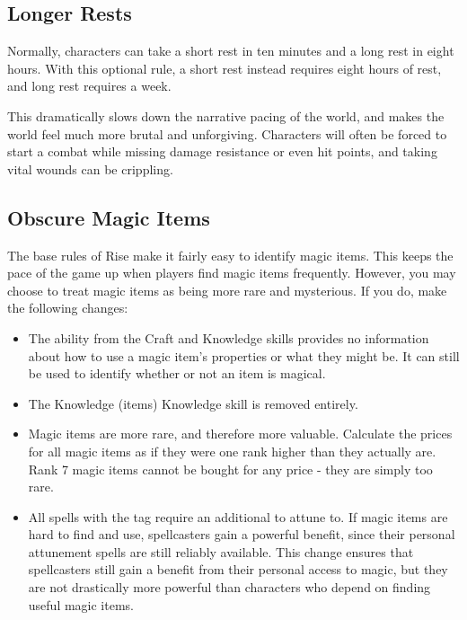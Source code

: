   \subsection{Longer Rests}\label{Longer Rests}
    Normally, characters can take a short rest in ten minutes and a long rest in eight hours.
    With this optional rule, a short rest instead requires eight hours of rest, and long rest requires a week.

    This dramatically slows down the narrative pacing of the world, and makes the world feel much more brutal and unforgiving.
    Characters will often be forced to start a combat while missing damage resistance or even hit points, and taking vital wounds can be crippling.

  \subsection{Obscure Magic Items}\label{Obscure Magic Items}
    The base rules of Rise make it fairly easy to identify magic items.
    This keeps the pace of the game up when players find magic items frequently.
    However, you may choose to treat magic items as being more rare and mysterious.
    If you do, make the following changes:
    \begin{itemize}
      \item The  ability from the Craft and Knowledge skills provides no information about how to use a magic item's properties or what they might be.
        It can still be used to identify whether or not an item is magical.
      \item The Knowledge (items) Knowledge skill is removed entirely.
      \item Magic items are more rare, and therefore more valuable.
        Calculate the prices for all magic items as if they were one rank higher than they actually are.
        Rank 7 magic items cannot be bought for any price - they are simply too rare.
      \item All spells with the  tag require an additional  to attune to.
        If magic items are hard to find and use, spellcasters gain a powerful benefit, since their personal attunement spells are still reliably available.
        This change ensures that spellcasters still gain a benefit from their personal access to magic, but they are not drastically more powerful than characters who depend on finding useful magic items.
    \end{itemize}


